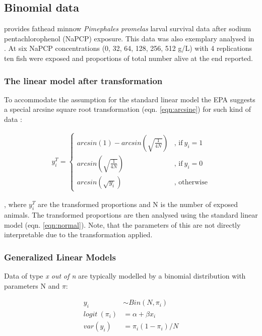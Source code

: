 \documentclass{scrartcl}
\begin{document}
\subsection{Binomial data}
\citet{weber_short-term_1989} provides fathead minnow \textit{Pimephales promelas} larval survival data after sodium pentachlorophenol (NaPCP) exposure.
This data was also exemplary analysed in \citet{newman_quantitative_2012}.
At six NaPCP concentrations (0, 32, 64, 128, 256, 512 \textmu g/L) with 4 replications ten fish were exposed and proportions of total number alive at the end reported.

\subsubsection{The linear model after transformation}
To accommodate the assumption for the standard linear model the EPA suggests a special arcsine square root transformation (eqn. \ref{eqn:arcsine}) for such kind of data \citep{epa_methods_2002}:

\begin{align}
  y_i^T = 
  \begin{cases}  
    arcsin(1) - arcsin(\sqrt{\frac{1}{4N}}) & \text{, if}\ y_i = 1 \\
    arcsin(\sqrt{\frac{1}{4N}}) & \text{, if}\ y_i = 0  \\
    arcsin(\sqrt{y_i}) & \text{, otherwise}
  \end{cases} \label{eqn:arcsine}
\end{align}

, where $y_i^T$ are the transformed proportions and N is the number of exposed animals.
The transformed proportions are then analysed using the standard linear model (eqn. \ref{eqn:normal}).
Note, that the parameters of this are not directly interpretable due to the transformation applied.


\subsubsection{Generalized Linear Models}
Data of type \emph{x out of n} are typically modelled by a binomial distribution with parameters N and $\pi$:

\begin{align}
  y_i &\sim Bin(N, \pi_i) \nonumber \\
  logit~(\pi_i) &= \alpha + \beta x_i \label{eqn:bin} \\
  var(y_i) &=  \pi_i (1 - \pi_i) / N \nonumber
\end{align}
\end{document}
